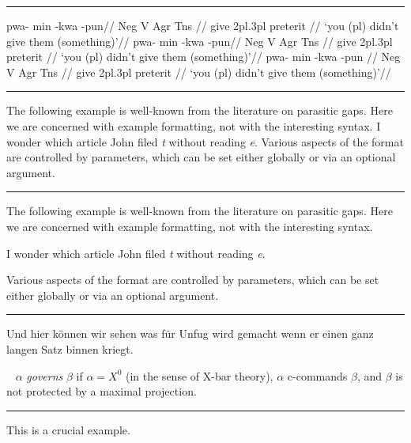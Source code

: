 \documentclass[12pt]{article}
\begin{document}
\hrule\medskip

\begingroup
\pex[interpartskip=3ex]
\a
\begingl
\gla pwa- min -kwa -pun//
\glb Neg V Agr Tns //
\glc {} give 2pl.3pl preterit //
\glft `you (pl) didn't give them (something)'//
\endgl
\a
\begingl[everygl=\openup.5ex,everygla=,everyglb=,
   everyglft=\it,aboveglftskip=1.5ex]
\gla pwa- min -kwa -pun//
\glb Neg V Agr Tns //
\glc {} give 2pl.3pl preterit //
\glft `you (pl) didn't give them (something)'//
\endgl
\a
\begingl[everygl=,everygla=\bf,everyglb=\it,
   everyglft=,aboveglftskip=0pt]
\gla pwa- min -kwa -pun //
\glb Neg V Agr Tns //
\glc {} give 2pl.3pl preterit //
\glft `you (pl) didn't give them (something)'//
\endgl
\xe
\endgroup
\bigskip

\hrule\medskip

\begingroup
\exdisplay
The following example is well-known from the literature on
parasitic gaps.  Here we are concerned with example formatting,
not with the interesting syntax.
\ex
I wonder which article John filed {\sl t\/} without reading {\sl e}.
\xe
Various aspects of the format are controlled by parameters, which
can be set either globally or via an optional argument.
\xe
\endgroup
\bigskip

\hrule\medskip

\begingroup
\exdisplay
The following example is well-known from the literature on
parasitic gaps.  Here we are concerned with example formatting,
not with the interesting syntax.

\ex[numoffset=2em,textoffset=.5em,aboveexskip=1ex,belowexskip=1ex]
I wonder which article John filed {\sl t\/} without reading {\sl e}.
\xe

\noindent Various aspects of the format are controlled by
parameters, which can be set either globally or via an optional
argument.
\xe
\endgroup
\bigskip

\hrule\medskip

\begingroup
\ex
Und hier k\"onnen wir sehen was f\"ur Unfug wird gemacht
wenn er einen ganz langen Satz binnen kriegt.\par\nobreak
\xe

\ex~
$\alpha$ {\it governs\/} $\beta$ if $\alpha=X^0$ (in the
sense of X-bar theory), $\alpha$ c-commands $\beta$, and $\beta$
is not protected by a maximal projection.
\xe
\endgroup
\bigskip

\hrule\medskip

\begingroup
\ex[exno=95] This is a crucial example.\xe
\end{document}
